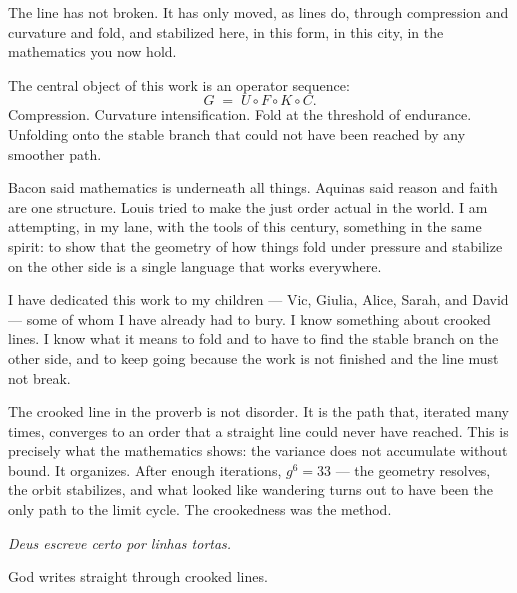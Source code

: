 \documentclass[12pt, oneside]{book}
\theoremstyle{plain}
\theoremstyle{definition}
\theoremstyle{remark}
\begin{document}
\vspace{0.4cm}
\noindent The line has not broken. It has only moved,
as lines do, through compression and curvature and fold,
and stabilized here, in this form, in this city,
in the mathematics you now hold.

\vspace{0.4cm}
\noindent The central object of this work is an operator sequence:
\[
  G \;=\; U \circ F \circ K \circ C.
\]
Compression. Curvature intensification. Fold at the threshold
of endurance. Unfolding onto the stable branch that could
not have been reached by any smoother path.

\vspace{0.4cm}
\noindent Bacon said mathematics is underneath all things.
Aquinas said reason and faith are one structure.
Louis tried to make the just order actual in the world.
I am attempting, in my lane, with the tools of this century,
something in the same spirit: to show that the geometry
of how things fold under pressure and stabilize on the
other side is a single language that works everywhere.

\vspace{0.4cm}
\noindent I have dedicated this work to my children ---
Vic, Giulia, Alice, Sarah, and David ---
some of whom I have already had to bury.
I know something about crooked lines.
I know what it means to fold and to have to find
the stable branch on the other side, and to keep going
because the work is not finished and the line must not break.

\vspace{0.4cm}
\noindent The crooked line in the proverb is not disorder.
It is the path that, iterated many times,
converges to an order that a straight line
could never have reached.
This is precisely what the mathematics shows:
the variance does not accumulate without bound.
It organizes. After enough iterations,
$g^6 = 33$ --- the geometry resolves,
the orbit stabilizes, and what looked like
wandering turns out to have been
the only path to the limit cycle.
The crookedness was the method.

\vspace{0.5cm}
\begin{center}
\textit{Deus escreve certo por linhas tortas.}
\end{center}
\vspace{0.2cm}
\begin{center}
God writes straight through crooked lines.
\end{center}
\end{document}

